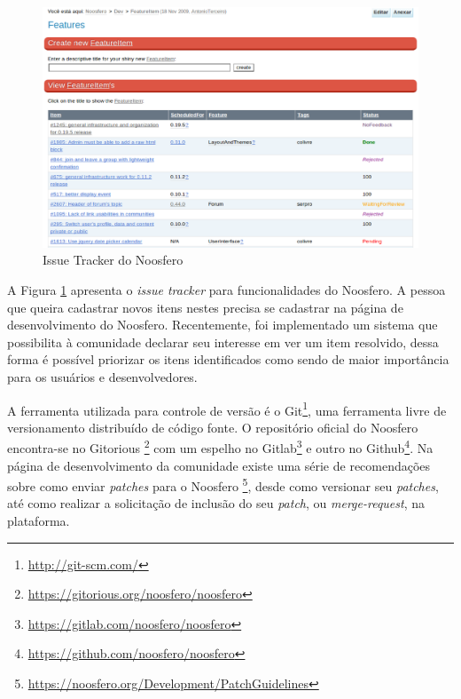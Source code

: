 \begin{figure}[h]
    \centering
    \includegraphics[keepaspectratio=true,scale=0.4]
      {figuras/issue-tracker.eps}
    \caption{Issue Tracker do Noosfero}
    \label{issue-tracker}
\end{figure}

A Figura \ref{issue-tracker} apresenta o \textit{issue tracker} para
funcionalidades do Noosfero.
%
A pessoa que queira cadastrar novos itens nestes precisa se cadastrar
na página de desenvolvimento do Noosfero.
%
Recentemente, foi implementado um sistema que possibilita à comunidade declarar
seu interesse em ver um item resolvido, dessa forma é possível priorizar os
itens identificados como sendo de maior importância para os usuários e
desenvolvedores.

A ferramenta utilizada para controle de versão é o Git\footnote{
\url{http://git-scm.com/}}, uma ferramenta livre de versionamento distribuído
de código fonte. O repositório oficial do Noosfero encontra-se no Gitorious
\footnote{\url{https://gitorious.org/noosfero/noosfero}} com um espelho no
Gitlab\footnote{\url{https://gitlab.com/noosfero/noosfero}} e outro no
Github\footnote{\url{https://github.com/noosfero/noosfero}}.
%
Na página de desenvolvimento da comunidade existe uma série de recomendações
sobre como enviar \textit{patches} para o Noosfero%
\footnote{\url{https://noosfero.org/Development/PatchGuidelines}},
desde como versionar seu \textit{patches}, até como realizar a solicitação de
inclusão do seu \textit{patch}, ou \textit{merge-request}, na plataforma.

